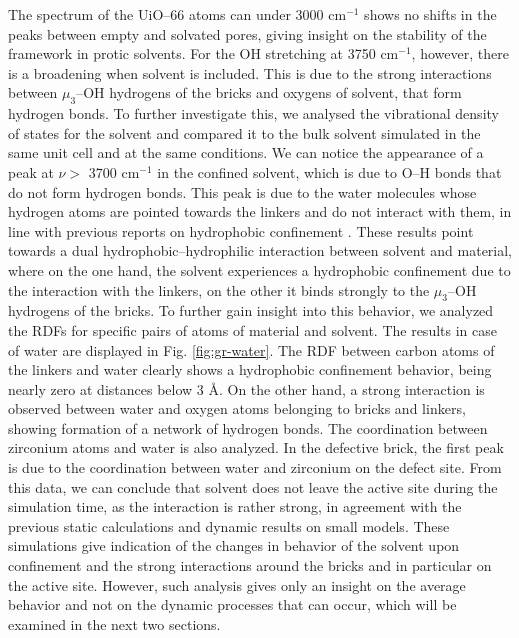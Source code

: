 The spectrum of the UiO--66 atoms can under 3000 cm$^{-1}$ shows no shifts in the peaks between empty and solvated pores, giving insight on the stability of the framework in protic solvents. For the OH stretching at 3750 cm$^{-1}$, however, there is a broadening when solvent is included. This is due to the strong interactions between $\mu_3$--OH hydrogens of the bricks and oxygens of solvent, that form hydrogen bonds. To further investigate this, we analysed the vibrational density of states for the solvent and compared it to the bulk solvent simulated in the same unit cell and at the same conditions. We can notice the appearance of a peak at $\nu >$ 3700 cm$^{-1}$ in the confined solvent, which is due to O--H bonds that do not form hydrogen bonds. This peak is due to the water molecules whose hydrogen atoms are pointed towards the linkers and do not interact with them, in line with previous reports on hydrophobic confinement \cite{coudert2006dipole, dalla2016water, cicero2008water}. 
\npar
These results point towards a dual hydrophobic--hydrophilic interaction between solvent and material, where on the one hand, the solvent experiences a hydrophobic confinement due to the interaction with the linkers, on the other it binds strongly to the $\mu_3$--OH hydrogens of the bricks. To further gain insight into this behavior, we analyzed the RDFs for specific pairs of atoms of material and solvent. The results in case of water are displayed in Fig. \ref{fig:gr-water}. The RDF between carbon atoms of the linkers and water clearly shows a hydrophobic confinement behavior, being nearly zero at distances below 3 \AA. On the other hand, a strong interaction is observed between water and oxygen atoms belonging to bricks and linkers, showing formation of a network of hydrogen bonds. The coordination between zirconium atoms and water is also analyzed. In the defective brick, the first peak is due to the coordination between water and zirconium on the defect site. 
\npar
From this data, we can conclude that solvent does not leave the active site during the simulation time, as the interaction is rather strong, in agreement with the previous static calculations and dynamic results on small models. These simulations give indication of the changes in behavior of the solvent upon confinement and the strong interactions around the bricks and in particular on the active site. However, such analysis gives only an insight on the average behavior and not on the dynamic processes that can occur, which will be examined in the next two sections. 


